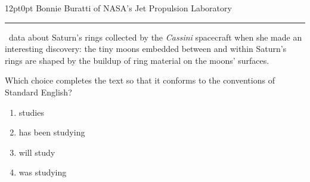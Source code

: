 \documentclass[11pt, twocolumn]{article}
\newcounter{questionnum}
\begin{document}
\vspace{6pt}\noindent
\begin{minipage}{\columnwidth}\raggedright
\noindent{}\par\vspace{8pt}
\begin{adjustwidth}{12pt}{0pt}
Bonnie Buratti of NASA's Jet Propulsion Laboratory \,\rule{2cm}{0.4pt}\, data about Saturn's rings collected by the \textit{Cassini }spacecraft when she made an interesting discovery: the tiny moons embedded between and within Saturn's rings are shaped by the buildup of ring material on the moons' surfaces.
\vspace{6pt}

Which choice completes the text so that it conforms to the conventions of Standard English?
\begin{enumerate}[label=\Alph*),leftmargin=18pt,topsep=3pt,itemsep=2pt]
  \item studies
  \item has been studying
  \item will study
  \item was studying
\end{enumerate}
\end{adjustwidth}
\end{minipage}\par
\end{document}
